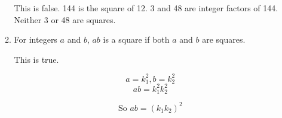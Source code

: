 \documentclass{article}
\begin{document}
\begin{enumerate}
\begin{enumerate}
				This is false. 144 is the square of 12. 3 and 48 are integer factors of 144. Neither 3 or 48 are squares.
				
			\item For integers $a$ and $b$, $ab$ is a square if both $a$ and $b$ are squares.
			
				This is true.
				
				$$a = k_{1}^2, b = k_{2}^{2}$$
				$$ab =  k_{1}^{2} k_{2}^{2}$$
				
				$$\text{So } ab = (k_1 k_2)^2$$
		
		\end{enumerate}	
	
	\end{enumerate}
	

	
\end{document}
